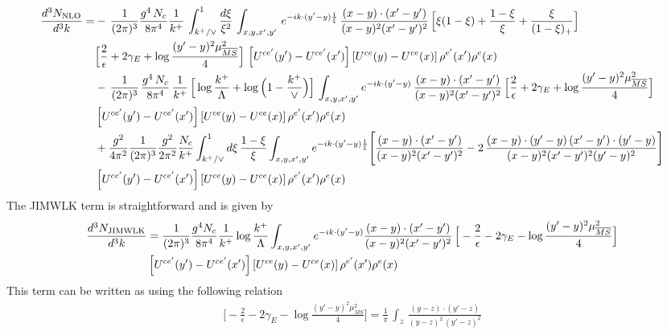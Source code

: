 \documentclass[9pt]{article}
\numberwithin{equation}{section}
\begin{document}
\begin{align}\label{eq:third}
\frac{d^{3}N_{\rm NLO}}{d^{3}k}=&-\,\frac{1}{(2\pi)^{3}}\frac{g^{4}\,N_{c}}{8\pi^{4}}\frac{1}{k^{+}}\,\int_{k^{+}/\vee}^{1}\frac{d\xi}{\xi^{2}}\,\int_{x,y,x',y'}\,e^{-ik\cdot(y'-y)\frac{1}{\xi}}\,\frac{(x-y)\cdot(x'-y')}{(x-y)^{2}(x'-y')^{2}}\,\Big[\xi(1-\xi)+\frac{1-\xi}{\xi}+\frac{\xi}{(1-\xi)_{+}}\Big]\notag \\ & \Big[\frac{2}{\epsilon}+2\gamma_{E}+\log\frac{(y'-y)^{2}\mu^{2}_{\overline{MS}}}{4}\Big]\,\left[U^{ce'}(y')-U^{ce'}(x')\right]\left[U^{ce}(y)-U^{ce}(x)\right]\rho^{e'}(x')\rho^{e}(x)\notag\\&
-\,\frac{1}{(2\pi)^{3}}\,\frac{g^{4}\,N_{c}}{8\pi^{4}}\,\frac{1}{k^{+}}\,\Big[\log\frac{k^{+}}{\Lambda}+\log\Big(1-\frac{k^{+}}{\vee}\Big)\Big]\,\int_{x,y,x',y'}e^{-ik\cdot(y'-y)}\,\frac{(x-y)\cdot(x'-y')}{(x-y)^{2}(x'-y')^{2}}\,\Big[\frac{2}{\epsilon}+2\gamma_{E}+\log\frac{(y'-y)^{2}\mu^{2}_{\overline{MS}}}{4}\Big]\notag \\ & \left[U^{ce'}(y')-U^{ce'}(x')\right]\left[U^{ce}(y)-U^{ce}(x)\right]\rho^{e'}(x')\rho^{e}(x)\notag\\
&+\frac{g^{2}}{4\pi^{2}}\frac{1}{(2\pi)^{3}}\frac{g^{2}}{2\pi^{2}}\frac{N_{c}}{k^{+}}\int_{k^{+}/\vee}^{1}d\xi\,\frac{1-\xi}{\xi}\int_{x,y,x',y'}e^{-ik\cdot(y'-y)\frac{1}{\xi}}\Bigg[\frac{(x-y)\cdot(x'-y')}{(x-y)^{2}(x'-y')^{2}}-2\,\frac{(x-y)\cdot(y'-y)\,(x'-y')\cdot(y'-y)}{(x-y)^{2}(x'-y')^{2}(y'-y)^{2}}\Bigg]\notag \\ & \left[U^{ce'}(y')-U^{ce'}(x')\right]\left[U^{ce}(y)-U^{ce}(x)\right]\rho^{e'}(x')\rho^{e}(x)
\end{align}
The JIMWLK term is straightforward and is given by
\begin{align}\label{eq:jim}
\frac{d^{3}N_{\rm JIMWLK}}{d^{3}k} & = \frac{1}{(2\pi)^{3}}\frac{g^{4}N_{c}}{8\pi^{4}}\frac{1}{k^{+}}\log\frac{k^{+}}{\Lambda}\int_{x,y,x',y'}e^{-ik\cdot(y'-y)}\frac{(x-y)\cdot(x'-y')}{(x-y)^{2}(x'-y')^{2}}\,\Big[-\frac{2}{\epsilon}-2\gamma_{E}-\log\frac{(y'-y)^{2}\mu^{2}_{\overline{MS}}}{4}\Big]\notag \\ & \left[U^{ce'}(y')-U^{ce'}(x')\right]\left[U^{ce}(y)-U^{ce}(x)\right]\rho^{e'}(x')\rho^{e}(x)
\end{align}
This term can be written as using the following relation
\begin{align} \label{eq:div}
\Big[-\frac{2}{\epsilon}-2\gamma_{E}-\log\frac{(y'-y)^{2}\mu^{2}_{\overline{MS}}}{4}\Big] = \frac{1}{\pi}\, \int_{z}\,\frac{(y-z)\cdot (y'-z)}{(y-z)^{2}\,(y'-z)^{2}}
\end{align}
\end{document}
